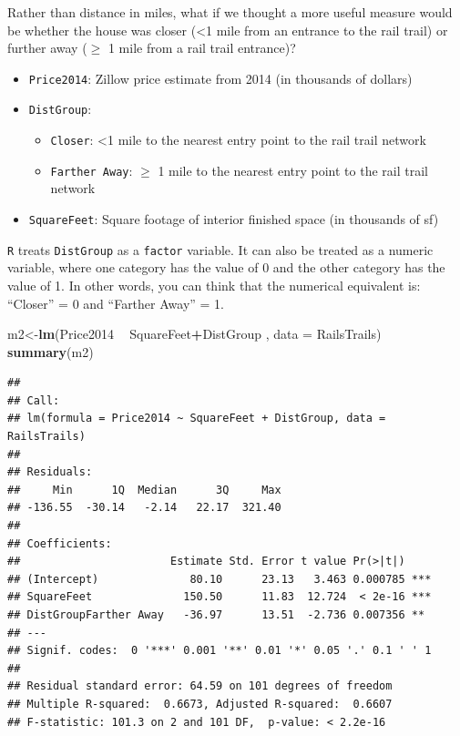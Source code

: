 \documentclass[]{article}
\newenvironment{Shaded}{\begin{snugshade}}{\end{snugshade}}
\newcommand{\DataTypeTok}[1]{\textcolor[rgb]{0.13,0.29,0.53}{#1}}
\newcommand{\KeywordTok}[1]{\textcolor[rgb]{0.13,0.29,0.53}{\textbf{#1}}}
\newcommand{\NormalTok}[1]{#1}
\newcommand{\OperatorTok}[1]{\textcolor[rgb]{0.81,0.36,0.00}{\textbf{#1}}}
\newcommand{\StringTok}[1]{\textcolor[rgb]{0.31,0.60,0.02}{#1}}
\providecommand{\tightlist}{%
  \setlength{\itemsep}{0pt}\setlength{\parskip}{0pt}}
\begin{document}
Rather than distance in miles, what if we thought a more useful measure
would be whether the house was closer (\textless{}1 mile from an
entrance to the rail trail) or further away (\(\geq\) 1 mile from a rail
trail entrance)?

\begin{itemize}
\tightlist
\item
  \texttt{Price2014}: Zillow price estimate from 2014 (in thousands of
  dollars)
\item
  \texttt{DistGroup}:

  \begin{itemize}
  \tightlist
  \item
    \texttt{Closer}: \textless{}1 mile to the nearest entry point to the
    rail trail network
  \item
    \texttt{Farther\ Away}: \(\geq\) 1 mile to the nearest entry point
    to the rail trail network
  \end{itemize}
\item
  \texttt{SquareFeet}: Square footage of interior finished space (in
  thousands of sf)
\end{itemize}

\texttt{R} treats \texttt{DistGroup} as a \texttt{factor} variable. It
can also be treated as a numeric variable, where one category has the
value of 0 and the other category has the value of 1. In other words,
you can think that the numerical equivalent is: ``Closer'' = 0 and
``Farther Away'' = 1.

\begin{Shaded}
\begin{Highlighting}[]
\NormalTok{m2<-}\KeywordTok{lm}\NormalTok{(Price2014 }\OperatorTok{~}\StringTok{ }\NormalTok{SquareFeet}\OperatorTok{+}\NormalTok{DistGroup , }\DataTypeTok{data =}\NormalTok{ RailsTrails)}
\KeywordTok{summary}\NormalTok{(m2)}
\end{Highlighting}
\end{Shaded}

\begin{verbatim}
## 
## Call:
## lm(formula = Price2014 ~ SquareFeet + DistGroup, data = RailsTrails)
## 
## Residuals:
##     Min      1Q  Median      3Q     Max 
## -136.55  -30.14   -2.14   22.17  321.40 
## 
## Coefficients:
##                       Estimate Std. Error t value Pr(>|t|)    
## (Intercept)              80.10      23.13   3.463 0.000785 ***
## SquareFeet              150.50      11.83  12.724  < 2e-16 ***
## DistGroupFarther Away   -36.97      13.51  -2.736 0.007356 ** 
## ---
## Signif. codes:  0 '***' 0.001 '**' 0.01 '*' 0.05 '.' 0.1 ' ' 1
## 
## Residual standard error: 64.59 on 101 degrees of freedom
## Multiple R-squared:  0.6673, Adjusted R-squared:  0.6607 
## F-statistic: 101.3 on 2 and 101 DF,  p-value: < 2.2e-16
\end{verbatim}
\end{document}
